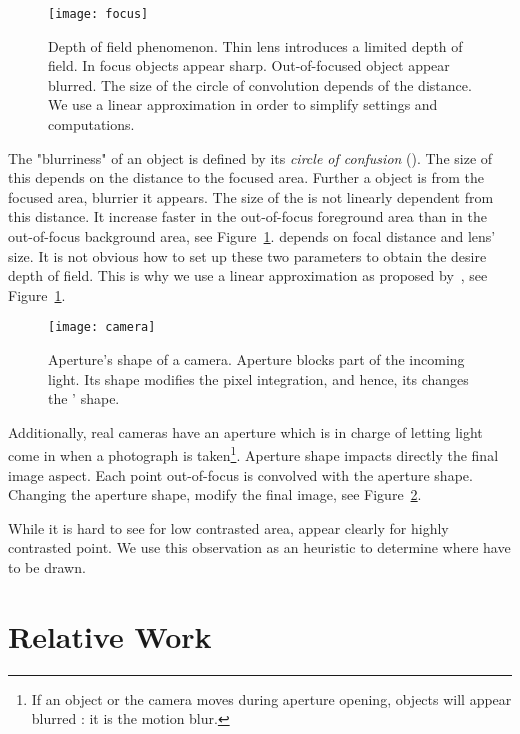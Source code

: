 	\begin{figure}[htb]\centering
	\texttt{[image: focus]}
	\caption{Depth of field phenomenon. Thin lens introduces a limited depth of field. In focus objects appear sharp. Out-of-focused object appear blurred. The size of the circle of convolution depends of the distance. We use a linear approximation in order to simplify settings and computations. }
	\label{DeRousiers:focus}
	\end{figure}


The "blurriness" of an object is defined by its \emph{circle of confusion} (\coc). The size of this \coc depends on the distance to the focused area. Further a object is from the focused area, blurrier it appears. The size of the \coc is not linearly dependent from this distance. It increase faster in the out-of-focus foreground area than in the out-of-focus background area, see Figure~\ref{DeRousiers:focus}. \coc depends on focal distance and lens' size. It is not obvious how to set up these two parameters to obtain the desire depth of field. This is why we use a linear approximation as proposed by~\cite{Hammon07}, see Figure~\ref{DeRousiers:focus}.

	\begin{figure}[htb]\centering
	\texttt{[image: camera]}
	\caption{Aperture's shape of a camera. Aperture blocks part of the incoming light. Its shape modifies the pixel integration, and hence, its changes the \bokehs' shape. }
	\label{DeRousiers:camera}
	\end{figure}

Additionally, real cameras have an aperture which is in charge of letting light come in when a photograph is taken\footnote{If an object or the camera moves during aperture opening, objects will appear blurred : it is the motion blur.}. Aperture shape impacts directly the final image aspect. Each point out-of-focus is convolved with the aperture shape. Changing the aperture shape, modify the final image, see Figure~\ref{DeRousiers:camera}.

While it is hard to see \bokeh for low contrasted area, \bokehs appear clearly for highly contrasted point. We use this observation as an heuristic to determine where \bokehs have to be drawn.

\section{Relative Work}\label{Derousiers:RelativeWork}

